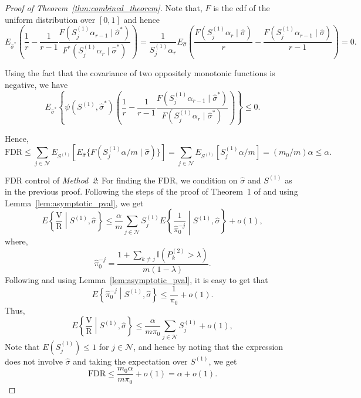 \documentclass[11pt]{article}
\numberwithin{equation}{section}
\theoremstyle{plain}
\theoremstyle{remark}
\begin{document}
\begin{proof}[Proof of Theorem~\ref{thm:combined_theorem}]
Note that, $F$ is the cdf of the uniform distribution over $[0,1]$ and hence
\[
E_{\hat{\sigma}^*}\left(\frac{1}{r}-\frac{1}{r-1}\frac{F(S^{(1)}_j\alpha_{r-1}\mid \hat{\sigma}^*)}{F^*(S^{(1)}_j\alpha_r\mid \hat{\sigma}^*)}\right)=\frac{1}{S^{(1)}_j\alpha_r}E_{\hat{\sigma}}\left( \frac{F(S^{(1)}_j\alpha_r\mid \hat{\sigma})}{r} - \frac{F(S^{(1)}_j\alpha_{r-1}\mid \hat{\sigma})}{r - 1} \right)=0.
\]

Using the fact that the covariance of two oppositely monotonic functions is negative, we have
\[
E_{\hat{\sigma}^*}\left\{\psi(S^{(1)},\hat{\sigma}^*)\left(\frac{1}{r}-\frac{1}{r-1}\frac{F(S^{(1)}_j\alpha_{r-1}\mid \hat{\sigma}^*)}{F(S^{(1)}_j\alpha_r\mid \hat{\sigma}^*)}\right)\right\}\leq 0.
\]

Hence, 
\[
\mathrm{FDR}\leq \sum_{j\in\mathcal{N}} E_{S^{(1)}}[E_{\hat{\sigma}}\{F(S^{(1)}_j\alpha/m\mid\hat{\sigma})\}] = \sum_{j\in\mathcal{N}} E_{S^{(1)}} [S^{(1)}_j\alpha/m]=(m_0/m)\alpha\leq \alpha. 
\]

\medskip
FDR control of \textit{Method~2}: 
For finding the FDR, we condition on $\hat{\sigma}$ and $S^{(1)}$ as in the previous proof. Following the steps of the proof of Theorem~1 of \citet{ramdas2019unified} and using Lemma~\ref{lem:asymptotic_pval}, we get
\[
E\left\{ \frac{\text{V}}{\text{R}} \middle| S^{(1)},\hat{\sigma} \right\} \leq \frac{\alpha}{m} \sum_{j \in \mathcal{N}} S^{(1)}_j E \left\{ \frac{1}{\hat{\pi}^{-j}_{0}} \middle| S^{(1)},\hat{\sigma} \right\} + o(1),
\]
where,
\[
\hat{\pi}^{-j}_{0} = \frac{1 + \sum_{k \neq j} \mathbb{I}(P^{(2)}_k > \lambda)}{m(1 - \lambda)}.
\]
Following \citet{benjamini2006adaptive} and using Lemma~\ref{lem:asymptotic_pval}, it is easy to get that 
\[
E \left\{ \hat{\pi}^{-j}_{0} \middle| S^{(1)},\hat{\sigma} \right\} \leq \frac{1}{\pi_0} + o(1).
\]
Thus,
\[
E\left\{ \frac{\text{V}}{\text{R}} \middle| S^{(1)},\hat{\sigma} \right\} \leq \frac{\alpha}{m\pi_0} \sum_{j \in \mathcal{N}} S^{(1)}_j + o(1),
\]
Note that \(E(S_j^{(1)}) \leq 1\) for \(j \in \mathcal{N}\), and hence by noting that the expression does not involve $\hat{\sigma}$ and taking the expectation over $S^{(1)}$, we get  
\[
\mathrm{FDR} \leq \frac{m_0\alpha}{m\pi_0} + o(1)=\alpha + o(1).
\]


\end{proof}
\end{document}
